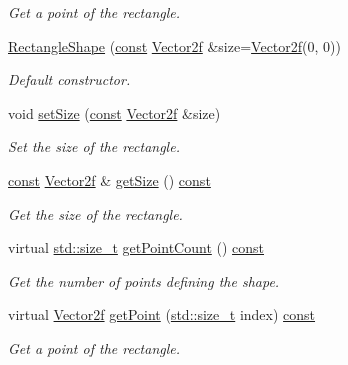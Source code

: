 \begin{DoxyCompactItemize}
\begin{DoxyCompactList}\small\item\em Get a point of the rectangle. \end{DoxyCompactList}\item 
\hyperlink{classsf_1_1_rectangle_shape_a83a2be157ebee85c95ed491c3e78dd7c}{Rectangle\-Shape} (\hyperlink{term__entry_8h_a57bd63ce7f9a353488880e3de6692d5a}{const} \hyperlink{namespacesf_a80cea3c46537294fd1d8d428566ad8b2}{Vector2f} \&size=\hyperlink{namespacesf_a80cea3c46537294fd1d8d428566ad8b2}{Vector2f}(0, 0))
\begin{DoxyCompactList}\small\item\em Default constructor. \end{DoxyCompactList}\item 
void \hyperlink{classsf_1_1_rectangle_shape_a5c65d374d4a259dfdc24efdd24a5dbec}{set\-Size} (\hyperlink{term__entry_8h_a57bd63ce7f9a353488880e3de6692d5a}{const} \hyperlink{namespacesf_a80cea3c46537294fd1d8d428566ad8b2}{Vector2f} \&size)
\begin{DoxyCompactList}\small\item\em Set the size of the rectangle. \end{DoxyCompactList}\item 
\hyperlink{term__entry_8h_a57bd63ce7f9a353488880e3de6692d5a}{const} \hyperlink{namespacesf_a80cea3c46537294fd1d8d428566ad8b2}{Vector2f} \& \hyperlink{classsf_1_1_rectangle_shape_acaacbaee87c38a526a9d895742faab54}{get\-Size} () \hyperlink{term__entry_8h_a57bd63ce7f9a353488880e3de6692d5a}{const} 
\begin{DoxyCompactList}\small\item\em Get the size of the rectangle. \end{DoxyCompactList}\item 
virtual \hyperlink{nc__alloc_8h_a7b60c5629e55e8ec87a4547dd4abced4}{std\-::size\-\_\-t} \hyperlink{classsf_1_1_rectangle_shape_a22d960c8122c74682b6ab4e6cf4ef1aa}{get\-Point\-Count} () \hyperlink{term__entry_8h_a57bd63ce7f9a353488880e3de6692d5a}{const} 
\begin{DoxyCompactList}\small\item\em Get the number of points defining the shape. \end{DoxyCompactList}\item 
virtual \hyperlink{namespacesf_a80cea3c46537294fd1d8d428566ad8b2}{Vector2f} \hyperlink{classsf_1_1_rectangle_shape_a335ced9de019b381955d50afdacf057c}{get\-Point} (\hyperlink{nc__alloc_8h_a7b60c5629e55e8ec87a4547dd4abced4}{std\-::size\-\_\-t} index) \hyperlink{term__entry_8h_a57bd63ce7f9a353488880e3de6692d5a}{const} 
\begin{DoxyCompactList}\small\item\em Get a point of the rectangle. \end{DoxyCompactList}\end{DoxyCompactItemize}
